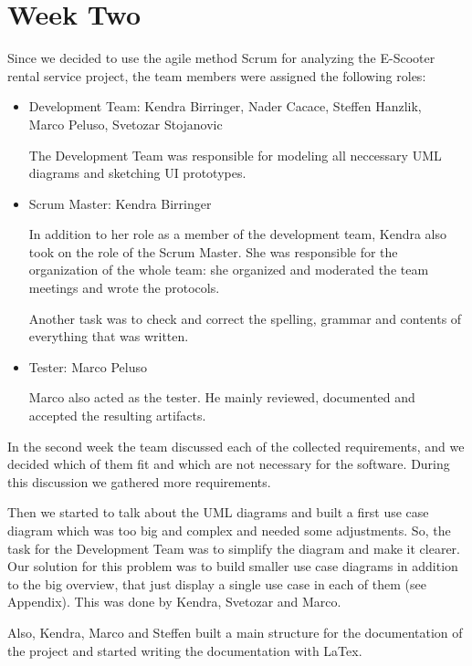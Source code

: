 \documentclass[a4paper, 12pt]{article}
\begin{document}
\section{Week Two}
Since we decided to use the agile method Scrum for analyzing the E-Scooter rental service project, the team members were assigned the following roles:

\begin{itemize}
\item Development Team: Kendra Birringer, Nader Cacace, Steffen Hanzlik,\\
      Marco Peluso, Svetozar Stojanovic
      
The Development Team was responsible for modeling all neccessary UML diagrams and sketching UI prototypes.

\item Scrum Master: Kendra Birringer

In addition to her role as a member of the development team, Kendra also took on the role of the Scrum Master. She was responsible for the organization of the whole team: she organized and moderated the team meetings and wrote the protocols. 

Another task was to check and correct the spelling, grammar and contents of everything that was written.

\item Tester: Marco Peluso

Marco also acted as the tester. He mainly reviewed, documented and accepted the resulting artifacts.
\end{itemize}

In the second week the team discussed each of the collected requirements, and we decided which of them fit and which are not necessary for the software. During this discussion we gathered more requirements.

Then we started to talk about the UML diagrams and built a first use case diagram which was too big and complex and needed some adjustments. So, the task for the Development Team was to simplify the diagram and make it clearer. Our solution for this problem was to build smaller use case diagrams in addition to the big overview, that just display a single use case in each of them (see Appendix). This was done by Kendra, Svetozar and Marco.

Also, Kendra, Marco and Steffen built a main structure for the documentation of the project and started writing the documentation with LaTex. 
\end{document}
